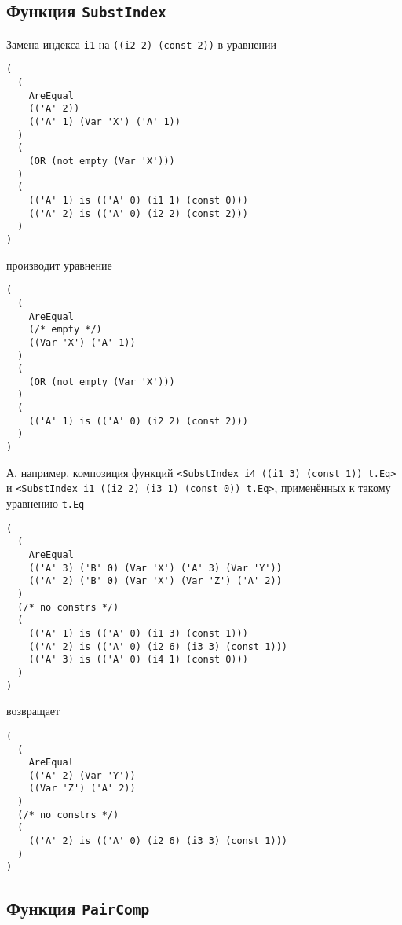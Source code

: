 \documentclass[12pt]{article}
\def\mir#1{\texttt{#1}} %
\begin{document}
\subsection{Функция \texttt{SubstIndex}}

Замена индекса \mir{i1} на \mir{((i2 2) (const 2))} в уравнении
\begin{verbatim}
(
  (
    AreEqual
    (('A' 2))
    (('A' 1) (Var 'X') ('A' 1))
  )
  (
    (OR (not empty (Var 'X')))
  )
  (
    (('A' 1) is (('A' 0) (i1 1) (const 0)))
    (('A' 2) is (('A' 0) (i2 2) (const 2)))
  )
)
\end{verbatim}
производит уравнение
\begin{verbatim}
(
  (
    AreEqual
    (/* empty */)
    ((Var 'X') ('A' 1))
  )
  (
    (OR (not empty (Var 'X')))
  )
  (
    (('A' 1) is (('A' 0) (i2 2) (const 2)))
  )
)
\end{verbatim}
А, например, композиция функций \mir{<SubstIndex i4 ((i1 3) (const 1)) t.Eq>}
и \mir{<SubstIndex i1 ((i2 2) (i3 1) (const 0)) t.Eq>}, применённых к такому
уравнению \mir{t.Eq}
\begin{verbatim}
(
  (
    AreEqual
    (('A' 3) ('B' 0) (Var 'X') ('A' 3) (Var 'Y'))
    (('A' 2) ('B' 0) (Var 'X') (Var 'Z') ('A' 2))
  )
  (/* no constrs */)
  (
    (('A' 1) is (('A' 0) (i1 3) (const 1)))
    (('A' 2) is (('A' 0) (i2 6) (i3 3) (const 1)))
    (('A' 3) is (('A' 0) (i4 1) (const 0)))
  )
)
\end{verbatim}
возвращает
\begin{verbatim}
(
  (
    AreEqual
    (('A' 2) (Var 'Y'))
    ((Var 'Z') ('A' 2))
  )
  (/* no constrs */)
  (
    (('A' 2) is (('A' 0) (i2 6) (i3 3) (const 1)))
  )
)
\end{verbatim}


\subsection{Функция \texttt{PairComp}}
\end{document}
